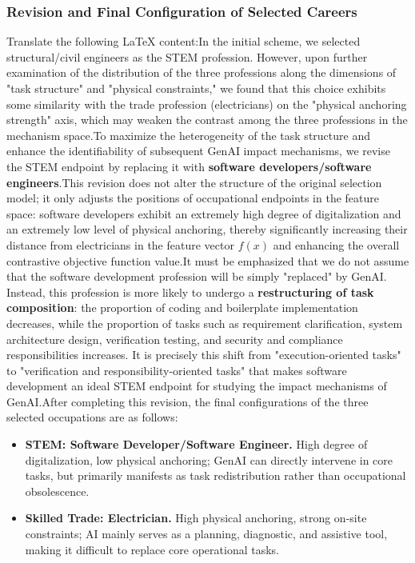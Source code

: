 \begin{figure}[H]
\end{figure}\subsubsection{Revision and Final Configuration of Selected Careers}Translate the following LaTeX content:In the initial scheme, we selected structural/civil engineers as the STEM profession. However, upon further examination of the distribution of the three professions along the dimensions of "task structure" and "physical constraints," we found that this choice exhibits some similarity with the trade profession (electricians) on the "physical anchoring strength" axis, which may weaken the contrast among the three professions in the mechanism space.To maximize the heterogeneity of the task structure and enhance the identifiability of subsequent GenAI impact mechanisms, we revise the STEM endpoint by replacing it with \textbf{software developers/software engineers}.This revision does not alter the structure of the original selection model; it only adjusts the positions of occupational endpoints in the feature space: software developers exhibit an extremely high degree of digitalization and an extremely low level of physical anchoring, thereby significantly increasing their distance from electricians in the feature vector $f(x)$ and enhancing the overall contrastive objective function value.It must be emphasized that we do not assume that the software development profession will be simply "replaced" by GenAI. Instead, this profession is more likely to undergo a \textbf{restructuring of task composition}: the proportion of coding and boilerplate implementation decreases, while the proportion of tasks such as requirement clarification, system architecture design, verification testing, and security and compliance responsibilities increases. It is precisely this shift from "execution-oriented tasks" to "verification and responsibility-oriented tasks" that makes software development an ideal STEM endpoint for studying the impact mechanisms of GenAI.After completing this revision, the final configurations of the three selected occupations are as follows:\begin{itemize}
    \item \textbf{STEM: Software Developer/Software Engineer.}
    High degree of digitalization, low physical anchoring; GenAI can directly intervene in core tasks, but primarily manifests as task redistribution rather than occupational obsolescence.

    \item \textbf{Skilled Trade: Electrician.}
    High physical anchoring, strong on-site constraints; AI mainly serves as a planning, diagnostic, and assistive tool, making it difficult to replace core operational tasks.


\end{itemize}
